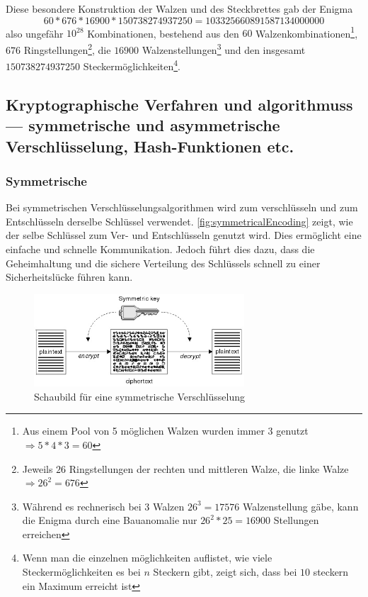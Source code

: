 Diese besondere Konstruktion der Walzen und des Steckbrettes gab der Enigma
\begin{equation}
    60 * 676 * 16900 * 150738274937250 = 103325660891587134000000\label{eq:equation}
\end{equation}
also ungefähr \(10^{28}\) Kombinationen, bestehend aus den \(60\) Walzenkombinationen\footnote{Aus einem Pool von 5 möglichen Walzen wurden immer 3 genutzt $\Rightarrow 5*4*3 = 60$}, \(676\) Ringstellungen\footnote{Jeweils \(26\) Ringstellungen der rechten und mittleren Walze, die linke Walze \(\Rightarrow 26^2 = 676\)}, die \(16900\) Walzenstellungen\footnote{Während es rechnerisch bei 3 Walzen \(26^3 = 17576\) Walzenstellung gäbe, kann die Enigma durch eine Bauanomalie nur \(26^2*25=16900\) Stellungen erreichen}\autocite[]{enigma_double_rotor} und den insgesamt \(150738274937250\) Steckermöglichkeiten\footnote{Wenn man die einzelnen möglichkeiten auflistet, wie viele Steckermöglichkeiten es bei $n$ Steckern gibt, zeigt sich, dass bei $10$ steckern ein Maximum erreicht ist}\autocite[\pagef~810]{anal_eval_enigma}.

\subsection[Kryptographische Verfahren und Algorithmen]{Kryptographische Verfahren und \glspl{algorithmus} — symmetrische und asymmetrische Verschlüsselung, Hash-Funktionen etc.}\label{subsec:kryptographische-verfahren-und-algorithmen}

\subsubsection[Symmetrische Verschlüsselungsalgorithmen]{Symmetrische }\label{subsubsec:symmetrsiche-algorithmen}
Bei symmetrischen Verschlüsselungsalgorithmen wird zum verschlüsseln und zum Entschlüsseln derselbe Schlüssel verwendet. \autoref{fig:symmetricalEncoding}\autocite{Chapter211:online} zeigt, wie der selbe Schlüssel zum Ver- und Entschlüsseln genutzt wird.
Dies ermöglicht eine einfache und schnelle Kommunikation.
Jedoch führt dies dazu, dass die Geheimhaltung und die sichere Verteilung des Schlüssels schnell zu einer Sicherheitslücke führen kann.

\begin{figure}[htbp]
    \includegraphics[width=0.7\textwidth]{abbildungen/symmetricEncoding}
    \centering
    \caption[
        Schaubild für eine symmetrische Verschlüsselung]{Schaubild für eine symmetrische Verschlüsselung\footnotemark}
    \label{fig:symmetricalEncoding}
\end{figure}


